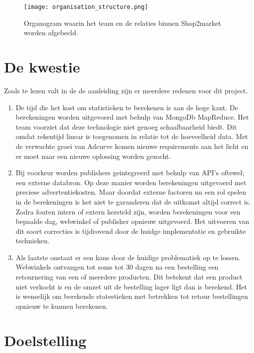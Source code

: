 \begin{figure}[h]
    \texttt{[image: organisation\_structure.png]}
    \caption{Organogram waarin het team en de relaties binnen Shop2market worden afgebeeld.}
    \label{fig:orgchart}
\end{figure}

\pagebreak

\section{De kwestie} %

Zoals te lezen valt in de de aanleiding zijn er meerdere redenen voor dit project.

\begin{enumerate}
    \item De tijd die het kost om statistieken te berekenen is aan de hoge kant. De berekeningen worden uitgevoerd met behulp van MongoDb MapReduce. Het team voorziet dat deze technologie niet genoeg schaalbaarheid biedt. Dit omdat rekentijd linear is toegenomen in relatie tot de hoeveelheid data. Met de verwachte groei van Adcurve komen nieuwe requirements aan het licht en er moet naar een nieuwe oplossing worden gezocht.
    \item Bij voorkeur worden publishers geintegreerd met behulp van API's oftewel; een externe databron. Op deze manier worden berekeningen uitgevoerd met preciese advertentiekosten. Maar doordat externe factoren nu een rol spelen in de berekeningen is het niet te garanderen dat de uitkomst altijd correct is. Zodra fouten intern of extern hersteld zijn, worden berekeningen voor een bepaalde dag, webwinkel of publisher opnieuw uitgevoerd. Het uitvoeren van dit soort correcties is tijdrovend door de huidge implementatie en gebruikte technieken.
    \item Als laatste onstaat er een kans door de huidige problematiek op te lossen. Webwinkels ontvangen tot soms tot 30 dagen na een bestelling een retournering van een of meerdere producten. Dit betekent dat een product niet verkocht is en de omzet uit de bestelling lager ligt dan is berekend. Het is wenselijk om berekende statestieken met betrekken tot retour bestellingen opnieuw te kunnen berekenen.
\end{enumerate}


\section{Doelstelling} %

